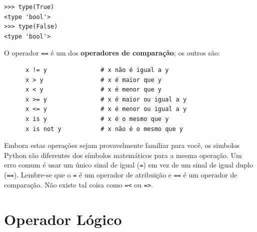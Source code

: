 \beforeverb
\begin{verbatim}
>>> type(True)
<type 'bool'>
>>> type(False)
<type 'bool'>
\end{verbatim}
\afterverb
%

O operador {\tt ==} é um dos {\bf operadores de comparação}; os
outros são:

\beforeverb
\begin{verbatim}
      x != y               # x não é igual a y
      x > y                # x é maior que y
      x < y                # x é menor que y
      x >= y               # x é maior ou igual a y
      x <= y               # x é menor ou igual a y
      x is y               # x é o mesmo que y
      x is not y           # x não é o mesmo que y
\end{verbatim}
\afterverb

%

Embora estas operações sejam provavelmente familiar para você, os simbolos
Python são diferentes dos símbolos matemáticos para a mesma 
operação.  Um erro comum
é usar um único sinal de igual ({\tt =}) em vez de um sinal de igual duplo
({\tt ==}).  Lembre-se que o {\tt =} é um operador de atribuição e 
{\tt ==} é um operador de comparação. Não existe tal coisa como
{\tt =<} ou {\tt =>}.




\section {Operador Lógico}

